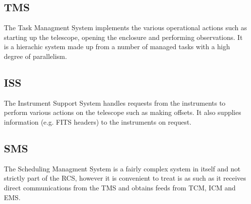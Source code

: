 \subsection{TMS}
The Task Managment System implements the various operational actions such as starting up the telescope, opening the enclosure and performing observations. It is a hierachic system made up from a number of managed tasks with a high degree of parallelism.

\subsection{ISS}
The Instrument Support System handles requests from the instruments to perform various actions on the telescope such as making offsets. It also supplies information (e.g. FITS headers) to the instruments on request. 

\subsection{SMS}
The Scheduling Managment System is a fairly complex system in itself and not strictly part of the RCS, however it is convenient to treat is as such as it receives direct communications from the TMS and obtains feeds from TCM, ICM and EMS.



